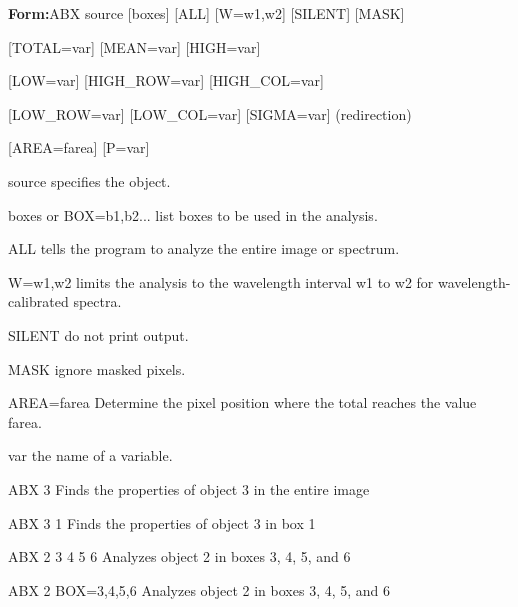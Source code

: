 {\newpage\clearpage
{}%
\begin{command}
  \item[\textbf{Form:}ABX source {[boxes]} {[ALL]} {[W=w1,w2]} {[SILENT]} 
       {[MASK]}\hfill]{}
  \item{{[TOTAL=var]} {[MEAN=var]} {[HIGH=var]}}
  \item{{[LOW=var]} {[HIGH\_ROW=var]} {[HIGH\_COL=var]}}
  \item{{[LOW\_ROW=var]} {[LOW\_COL=var]} {[SIGMA=var]} (redirection)}
  \item{{[AREA=farea]} {[P=var]}}
  \item[source]{specifies the object.}
  \item[boxes or BOX=b1,b2...]{list boxes to be used in the analysis.}
  \item[ALL]{tells the program to analyze the entire image or spectrum.}
  \item[W=w1,w2]{limits the analysis to the wavelength interval w1 to w2 for 
       wavelength-calibrated spectra.}
  \item[SILENT]{do not print output.} 
  \item[MASK]{ignore masked pixels.}
  \item[AREA=farea]{Determine the pixel position where the total reaches
       the value farea.}
  \item[var]{the name of a variable.}
\end{command}%
\lthtmlfigureZ
\lthtmlcheckvsize\clearpage}

{\newpage\clearpage
{}%
\begin{example}
  \item[ABX 3\hfill]{Finds the properties of object 3 in the entire image}
  \item[ABX 3 1\hfill]{Finds the properties of object 3 in box 1}
  \item[ABX 2 3 4 5 6\hfill]{Analyzes object 2 in boxes 3, 4, 5, and 6}
  \item[ABX 2 BOX=3,4,5,6 \hfill]{Analyzes object 2 in boxes 3, 4, 5, and 6}
\end{example}%
\lthtmlfigureZ
\lthtmlcheckvsize\clearpage}

